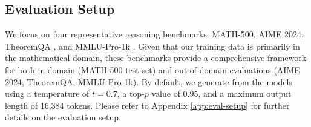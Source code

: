 \subsection{Evaluation Setup}\label{sec:eval-setup}

We focus on four representative reasoning benchmarks: MATH-500, AIME 2024, TheoremQA \citep{chen2023theoremqa}, and MMLU-Pro-1k \citep{wang2024mmlupro}. Given that our training data is primarily in the mathematical domain, these benchmarks provide a comprehensive framework for both in-domain (MATH-500 test set) and out-of-domain evaluations (AIME 2024, TheoremQA, MMLU-Pro-1k). By default, we generate from the models using a temperature of $t = 0.7$, a top-$p$ value of 0.95, and a maximum output length of 16,384 tokens. Please refer to Appendix \ref{app:eval-setup} for further details on the evaluation setup.
